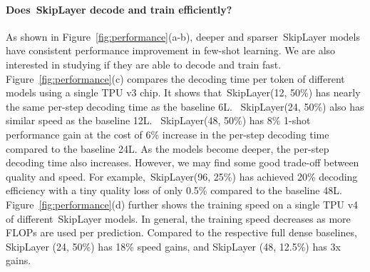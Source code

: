 \documentclass{article}
\newcommand{\skipl}{SkipLayer\xspace}
\begin{document}



\paragraph{Does~\skipl decode and train efficiently?} As shown in Figure~\ref{fig:performance}(a-b), deeper and sparser~\skipl models have consistent performance improvement in few-shot learning. We are also interested in studying if they are able to decode and train fast. Figure~\ref{fig:performance}(c) compares the decoding time per token of different models using a single TPU v3 chip. It shows that~\skipl(12, 50\%) has nearly the same per-step decoding time as the baseline 6L. ~\skipl(24, 50\%) also has similar speed as the baseline 12L. ~\skipl(48, 50\%) has 8\% 1-shot performance gain at the cost of 6\% increase in the per-step decoding time compared to the baseline 24L. As the models become deeper, the per-step decoding time also increases. However, we may find some good trade-off between quality and speed. For example,~\skipl(96, 25\%) has achieved 20\% decoding efficiency with a tiny quality loss of only 0.5\% compared to the baseline 48L. Figure~\ref{fig:performance}(d) further shows the training speed on a single TPU v4 of different~\skipl models. In general, the training speed decreases as more FLOPs are used per prediction. Compared to the respective full dense baselines, SkipLayer (24, 50\%) has 18\% speed gains, and SkipLayer (48, 12.5\%) has 3x gains.
\end{document}
